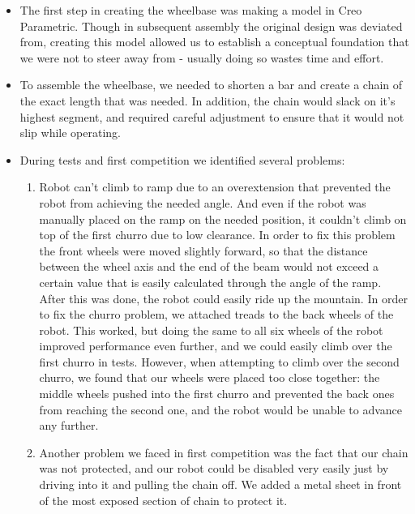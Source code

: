 \begin{itemize}
\item The first step in creating the wheelbase was making a model in Creo Parametric. Though in subsequent assembly the original design was deviated from, creating this model allowed us to establish a conceptual foundation that we were not to steer away from - usually doing so wastes time and effort.

\item To assemble the wheelbase, we needed to shorten a bar and create a chain of the exact length that was needed. In addition, the chain would slack on it's highest segment, and required careful adjustment to ensure that it would not slip while operating.

\item During tests and first competition we identified several problems:
	\begin{enumerate}
		\item Robot can't climb to ramp due to an overextension that prevented the robot from achieving the needed angle. And even if the robot was manually placed on the ramp on the needed position, it couldn't climb on top of the first churro due to low clearance. In order to fix this problem the front wheels were moved slightly forward, so that the distance between the wheel axis and the end of the beam would not exceed a certain value that is easily calculated through the angle of the ramp. After this was done, the robot could easily ride up the mountain. In order to fix the churro problem, we attached treads to the back wheels of the robot. This worked, but doing the same to all six wheels of the robot improved performance even further, and we could easily climb over the first churro in tests. However, when attempting to climb over the second churro, we found that our wheels were placed too close together:  the middle wheels pushed into the first churro and prevented the back ones from reaching the second one, and the robot would be unable to advance any further.
		
		\item Another problem we faced in first competition was the fact that our chain was not protected, and our robot could be disabled very easily just by driving into it and pulling the chain off. We added a metal sheet in front of the most exposed section of chain to protect it.
		

\end{enumerate}
\end{itemize}
